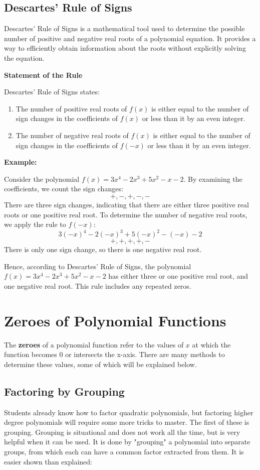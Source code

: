 \documentclass[11pt]{article}
\begin{document}
\subsection{Descartes' Rule of Signs}
Descartes' Rule of Signs is a mathematical tool used to determine the possible number of positive and negative real roots of a polynomial equation. It provides a way to efficiently obtain information about the roots without explicitly solving the equation.

\textbf{Statement of the Rule}

Descartes' Rule of Signs states:
\begin{enumerate}
  \item The number of positive real roots of $f(x)$ is either equal to the number of sign changes in the coefficients of $f(x)$ or less than it by an even integer.
  
  \item The number of negative real roots of $f(x)$ is either equal to the number of sign changes in the coefficients of $f(-x)$ or less than it by an even integer.
\end{enumerate}

\textbf{Example:}

Consider the polynomial $f(x) = 3x^4 - 2x^3 + 5x^2 - x - 2$. By examining the coefficients, we count the sign changes:
\[ +, -, +, -, - \]
There are three sign changes, indicating that there are either three positive real roots or one positive real root. To determine the number of negative real roots, we apply the rule to $f(-x)$:
\[ 3(-x)^4 - 2(-x)^3 + 5(-x)^2 - (-x) - 2 \]
\[ +, +, +, +, - \]
There is only one sign change, so there is one negative real root.

Hence, according to Descartes' Rule of Signs, the polynomial $f(x) = 3x^4 - 2x^3 + 5x^2 - x - 2$ has either three or one positive real root, and one negative real root. This rule includes any repeated zeros. 

\section{Zeroes of Polynomial Functions}
The \textbf{zeroes} of a polynomial function refer to the values of $x$ at which the function becomes $0$ or intersects the x-axis. There are many methods to determine these values, some of which will be explained below.

\subsection{Factoring by Grouping}
Students already know how to factor quadratic polynomials, but factoring higher degree polynomials will require some more tricks to master. The first of these is grouping. Grouping is situational and does not work all the time, but is very helpful when it can be used. It is done by "grouping" a polynomial into separate groups, from which each can have a common factor extracted from them. It is easier shown than explained:
\end{document}
